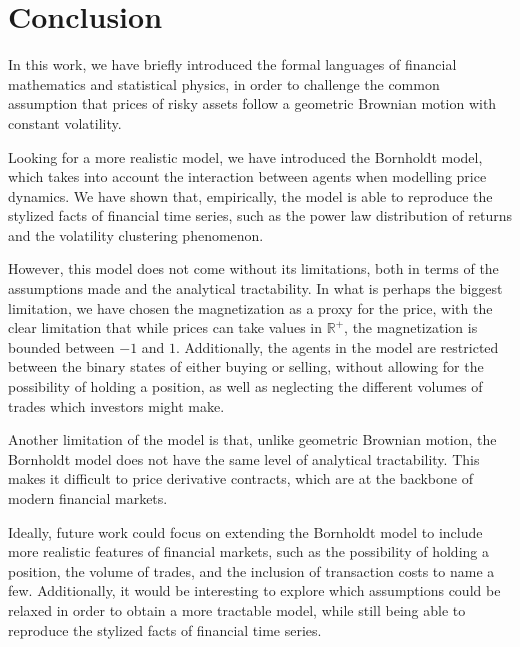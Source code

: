 \chapter{Conclusion}\label{ch:conclusion}
In this work, we have briefly introduced the formal languages of financial mathematics and statistical physics, in order to challenge the common assumption that prices of risky assets follow a geometric Brownian motion with constant volatility.

Looking for a more realistic model, we have introduced the Bornholdt model, which takes into account the interaction between agents when modelling price dynamics. We have shown that, empirically, the model is able to reproduce the stylized facts of financial time series, such as the power law distribution of returns and the volatility clustering phenomenon.

However, this model does not come without its limitations, both in terms of the assumptions made and the analytical tractability. In what is perhaps the biggest limitation, we have chosen the magnetization as a proxy for the price, with the clear limitation that while prices can take values in \(\mathbb{R}^+\), the magnetization is bounded between \(-1\) and \(1\). Additionally, the agents in the model are restricted between the binary states of either buying or selling, without allowing for the possibility of holding a position, as well as neglecting the different volumes of trades which investors might make.

Another limitation of the model is that, unlike geometric Brownian motion, the Bornholdt model does not have the same level of analytical tractability. This makes it difficult to price derivative contracts, which are at the backbone of modern financial markets.

Ideally, future work could focus on extending the Bornholdt model to include more realistic features of financial markets, such as the possibility of holding a position, the volume of trades, and the inclusion of transaction costs to name a few. Additionally, it would be interesting to explore which assumptions could be relaxed in order to obtain a more tractable model, while still being able to reproduce the stylized facts of financial time series.